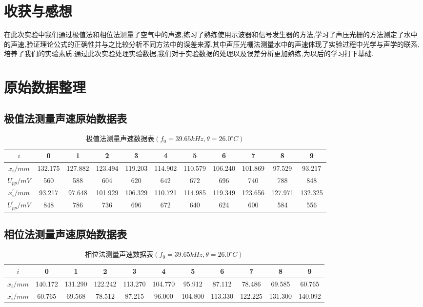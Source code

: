 \documentclass[a4 paper,12pt]{article}
\begin{document}
\section{收获与感想}
	在此次实验中我们通过极值法和相位法测量了空气中的声速,练习了熟练使用示波器和信号发生器的方法,学习了声压光栅的方法测定了水中的声速,验证理论公式的正确性并与之比较分析不同方法中的误差来源.其中声压光栅法测量水中的声速体现了实验过程中光学与声学的联系,培养了我们的实验素质.通过此次实验处理实验数据,我们对于实验数据的处理以及误差分析更加熟练,为以后的学习打下基础.
\section{原始数据整理}
\subsection{极值法测量声速原始数据表}
\begin{table}[H]
	\caption{极值法测量声速数据表$(f_{0}=39.65kHz,\theta=26.0^{\circ}C)$}
	\label{极值法测量声速数据表}
	\centering
	\resizebox{\textwidth}{!}
	{
		\begin{tabular}{*{11}{c}}
			\toprule[0.5mm]
			$i$&0&1&2&3&4&5&6&7&8&9\\
			\midrule
			$x_{i}/mm$&132.175&127.882&123.494&119.203&114.902&110.579&106.240&101.869&97.529&93.217\\
			\midrule
			$U_{pp}/mV$&560&588&604&620&642&672&696&740&788&848\\
			\bottomrule[0.5mm]
			$x_{i}^{\prime}/mm$&93.217&97.648&101.929&106.329&110.721&114.985&119.349&123.656&127.971&132.325\\
			\midrule
			$U_{pp}^{\prime}/mV$&848&786&736&696&672&640&624&600&584&556\\
			\bottomrule[0.5mm]
		\end{tabular}
	}
\end{table}

\subsection{相位法测量声速原始数据表}
\begin{table}[H]
	\caption{相位法测量声速数据表$(f_{0}=39.65kHz,\theta=26.0^{\circ}C)$}
	\label{相位法测量声速数据表}
	\centering
	\resizebox{\textwidth}{!}
	{
		\begin{tabular}{*{11}{c}}
			\toprule[0.5mm]
			$i$&0&1&2&3&4&5&6&7&8&9\\
			\midrule
			$x_{i}/mm$&140.172&131.290&122.242&113.270&104.770&95.912&87.112&78.486&69.585&60.765\\
			\midrule
			$x_{i}^{\prime}/mm$&60.765&69.568&78.512&87.215&96.000&104.800&113.330&122.225&131.300&140.092\\
			\bottomrule[0.5mm]
		\end{tabular}
	}
\end{table}
\end{document}

